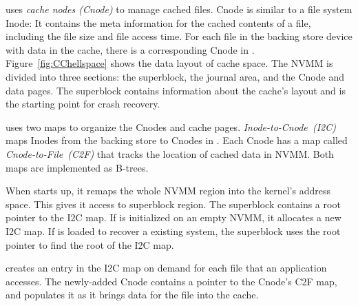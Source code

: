 \CChell{} uses \emph{cache nodes (Cnode)} to manage cached files.
Cnode is similar to a file system Inode:  It contains the meta information for
the cached contents of a file, including the file size and file access time.
For each file in the backing store device with data in the cache, there is a corresponding
Cnode in \drv{}.
Figure~\ref{fig:CChellspace} shows the data layout of cache space.
The NVMM is divided into three sections: the superblock, the journal area,
and the Cnode and data pages. The superblock
contains information about the cache's layout and is the starting point for crash recovery.

\Drv{} uses two maps to organize the Cnodes and cache pages.
\emph{Inode-to-Cnode~(I2C)} maps Inodes from the backing store to Cnodes in
\CChell{}.  Each Cnode has a map called \emph{Cnode-to-File~(C2F)} that tracks the location
of cached data in NVMM.  Both maps are implemented as B-trees.

When \drv{} starts up, it remaps the whole NVMM region into the kernel's address space. This gives it 
access to superblock region.
The superblock contains a root pointer to the I2C map.
If \drv{} is initialized on an empty
NVMM, it allocates a new I2C map.  If \drv{}
is loaded to recover a existing \CChell{} system, the superblock uses the root
pointer to find the root of the I2C map.

\Drv{} creates an entry in the I2C map on demand for each file that an
application accesses.  The newly-added Cnode contains a pointer to the Cnode's
C2F map, and \drv{} populates it as it brings data for the file into the cache.


